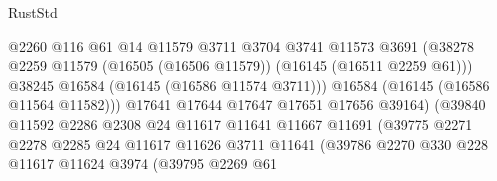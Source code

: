 \begin{lexlean}{RustStd}
\begin{coremodule}
                                          @2260
                                          @116
                                          @61
                                          @14
                                          @11579
                                          @3711
                                          @3704
                                          @3741
                                          @11573
                                          @3691
                                          (@38278
                                            @2259
                                            @11579
                                            (@16505 (@16506 @11579))
                                            (@16145 (@16511 @2259 @61)))
                                          @38245
                                          @16584
                                          (@16145 (@16586 @11574 @3711)))
                                        @16584
                                        (@16145 (@16586 @11564 @11582)))
                                      @17641
                                      @17644
                                      @17647
                                      @17651
                                      @17656
                                      @39164)
                                    (@39840
                                      @11592
                                      @2286
                                      @2308
                                      @24
                                      @11617
                                      @11641
                                      @11667
                                      @11691
                                      (@39775
                                        @2271
                                        @2278
                                        @2285
                                        @24
                                        @11617
                                        @11626
                                        @3711
                                        @11641
                                        (@39786
                                          @2270
                                          @330
                                          @228
                                          @11617
                                          @11624
                                          @3974
                                          (@39795
                                            @2269
                                            @61

\end{coremodule}
\end{lexlean}
